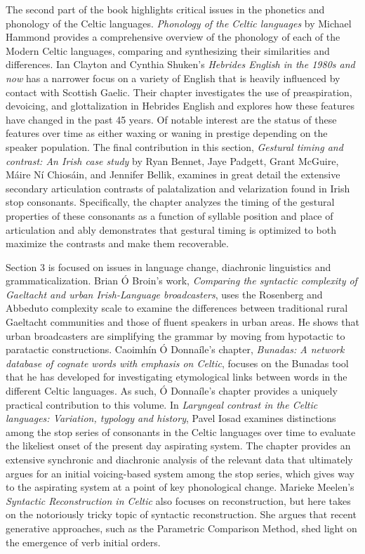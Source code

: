 \documentclass[output=paper]{langsci/langscibook}
\begin{document}
The second part of the book highlights critical issues in the phonetics and phonology of the Celtic languages. \textit{Phonology of the Celtic languages} by Michael Hammond provides a comprehensive overview of the phonology of each of the Modern Celtic languages, comparing and synthesizing their similarities and differences. Ian Clayton and Cynthia Shuken’s \textit{Hebrides English in the 1980s and now} has a narrower focus on a variety of English that is heavily influenced by contact with Scottish Gaelic. Their chapter investigates the use of preaspiration, devoicing, and glottalization in Hebrides English and explores how these features have changed in the past 45 years. Of notable interest are the status of these features over time as either waxing or waning in prestige depending on the speaker population. The final contribution in this section, \textit{Gestural timing and contrast: An Irish case study} by Ryan Bennet, Jaye Padgett, Grant McGuire, Máire Ní Chiosáin, and Jennifer Bellik, examines in great detail the extensive secondary articulation contrasts of palatalization and velarization found in Irish stop consonants. Specifically, the chapter analyzes the timing of the gestural properties of these consonants as a function of syllable position and place of articulation and ably demonstrates that gestural timing is optimized to both maximize the contrasts and make them recoverable. 

Section 3 is focused on issues in language change, diachronic linguistics and grammaticalization. Brian Ó Broin’s work, \textit{Comparing the syntactic complexity of Gaeltacht and urban Irish-Language broadcasters}, uses the Rosenberg and Abbeduto complexity scale to examine the differences between traditional rural Gaeltacht communities and those of fluent speakers in urban areas. He shows that urban broadcasters are simplifying the grammar by moving from hypotactic to paratactic constructions. Caoimhín Ó Donnaíle’s chapter, \textit{Bunadas: A network database of cognate words with emphasis on Celtic}, focuses on the Bunadas tool that he has developed for investigating etymological links between words in the different Celtic languages. As such, Ó Donnaíle’s chapter provides a uniquely practical contribution to this volume. In \textit{Laryngeal contrast in the Celtic languages: Variation, typology and history}, Pavel Iosad examines distinctions among the stop series of consonants in the Celtic languages over time to evaluate the likeliest onset of the present day aspirating system. The chapter provides an extensive synchronic and diachronic analysis of the relevant data that ultimately argues for an initial voicing-based system among the stop series, which  gives way to the aspirating system at a point of key phonological change. Marieke Meelen’s \textit{Syntactic Reconstruction in Celtic} also focuses on reconstruction, but here takes on the notoriously tricky topic of syntactic reconstruction. She argues that recent generative approaches, such as the Parametric Comparison Method, shed light on the emergence of verb initial orders.
\end{document}
